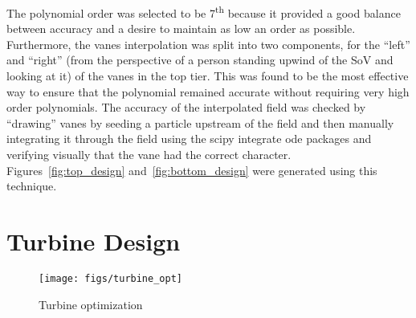 The polynomial order was selected to be 7\textsuperscript{th} because it
provided a good balance between accuracy and a desire to maintain as low
an order as possible. Furthermore, the vanes interpolation was split
into two components, for the ``left'' and ``right'' (from the perspective of a
person standing upwind of the SoV and looking at it) of the vanes in the
top tier. This was found to be the most effective way to ensure that the
polynomial remained accurate without requiring very high order
polynomials. The accuracy of the interpolated field was checked by
``drawing'' vanes by seeding a particle upstream of the field and then
manually integrating it through the field using the scipy integrate ode
packages and verifying visually that the vane had the correct
character. Figures~\ref{fig:top_design} and~\ref{fig:bottom_design} were
generated using this technique. 

%
%

\section{Turbine Design}

  \begin{figure}[!htb]
   \begin{center}
    \texttt{[image: figs/turbine\_opt]}
    \caption{Turbine optimization}
    \label{fig:ut_turbine}
   \end{center}
  \end{figure}


